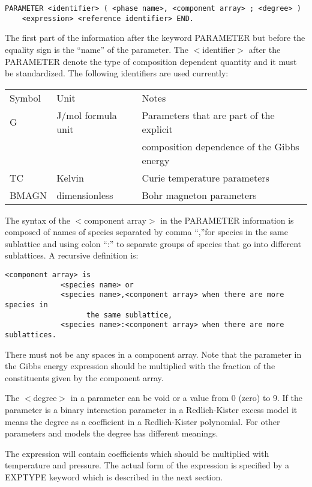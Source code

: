 \documentclass[12pt]{article}
\begin{document}
\begin{verbatim}
PARAMETER <identifier> ( <phase name>, <component array> ; <degree> )
    <expression> <reference identifier> END.
\end{verbatim}

The first part of the information after the keyword PARAMETER but
before the equality sign is the ``name'' of the parameter. The
$<$identifier$>$ after the PARAMETER denote the type of composition
dependent quantity and it must be standardized. The following
identifiers are used currently:

\begin{tabular}{lll}
Symbol & Unit &      Notes\\
G      & J/mol formula unit & Parameters that are part of the explicit\\
 && composition dependence of the Gibbs energy\\
TC    &Kelvin & Curie temperature parameters\\
BMAGN & dimensionless & Bohr magneton parameters\\
\end{tabular}

The syntax of the $<$component array$>$ in the PARAMETER information is
composed of names of species separated by comma ``,''for species in the
same sublattice and using colon ``:'' to separate groups of species that
go into different sublattices. A recursive definition is:

\begin{verbatim}
<component array> is
             <species name> or
             <species name>,<component array> when there are more species in
                   the same sublattice,
             <species name>:<component array> when there are more sublattices.
\end{verbatim}

There must not be any spaces in a component array. Note that the
parameter in the Gibbs energy expression should be multiplied with the
fraction of the constituents given by the component array.

The $<$degree$>$ in a parameter can be void or a value from 0 (zero)
to 9. If the parameter is a binary interaction parameter in a
Redlich-Kister excess model it means the degree as a coefficient in a
Redlich-Kister polynomial. For other parameters and models the
degree has different meanings.

The expression will contain coefficients which should be multiplied
with temperature and pressure. The actual form of the expression is
specified by a EXPTYPE keyword which is described in the next section.
\end{document}
